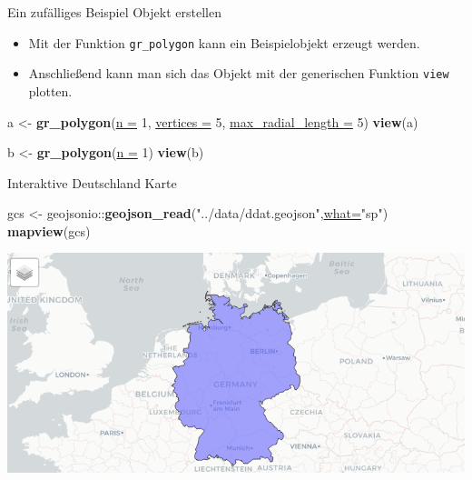 \documentclass[ignorenonframetext,]{beamer}
\newenvironment{Shaded}{\begin{snugshade}}{\end{snugshade}}
\newcommand{\DataTypeTok}[1]{\textcolor[rgb]{0.74,0.68,0.62}{\underline{#1}}}
\newcommand{\DecValTok}[1]{\textcolor[rgb]{0.27,0.67,0.26}{#1}}
\newcommand{\KeywordTok}[1]{\textcolor[rgb]{0.26,0.66,0.93}{\textbf{#1}}}
\newcommand{\NormalTok}[1]{\textcolor[rgb]{0.74,0.68,0.62}{#1}}
\newcommand{\OperatorTok}[1]{\textcolor[rgb]{0.74,0.68,0.62}{#1}}
\newcommand{\StringTok}[1]{\textcolor[rgb]{0.02,0.61,0.04}{#1}}
\providecommand{\tightlist}{%
  \setlength{\itemsep}{0pt}\setlength{\parskip}{0pt}}
\begin{document}
\begin{frame}[fragile]{Ein zufälliges Beispiel Objekt erstellen}
\protect\hypertarget{ein-zufalliges-beispiel-objekt-erstellen}{}

\begin{itemize}
\tightlist
\item
  Mit der Funktion \texttt{gr\_polygon} kann ein Beispielobjekt erzeugt
  werden.
\item
  Anschließend kann man sich das Objekt mit der generischen Funktion
  \texttt{view} plotten.
\end{itemize}

\begin{Shaded}
\begin{Highlighting}[]
\NormalTok{a <-}\StringTok{ }\KeywordTok{gr_polygon}\NormalTok{(}\DataTypeTok{n =} \DecValTok{1}\NormalTok{, }\DataTypeTok{vertices =} \DecValTok{5}\NormalTok{, }\DataTypeTok{max_radial_length =} \DecValTok{5}\NormalTok{)}
\KeywordTok{view}\NormalTok{(a)}
\end{Highlighting}
\end{Shaded}

\begin{Shaded}
\begin{Highlighting}[]
\NormalTok{b <-}\StringTok{ }\KeywordTok{gr_polygon}\NormalTok{(}\DataTypeTok{n =} \DecValTok{1}\NormalTok{)}
\KeywordTok{view}\NormalTok{(b)}
\end{Highlighting}
\end{Shaded}

\end{frame}

\begin{frame}[fragile]{Interaktive Deutschland Karte}
\protect\hypertarget{interaktive-deutschland-karte}{}

\begin{Shaded}
\begin{Highlighting}[]
\NormalTok{gcs <-}\StringTok{ }\NormalTok{geojsonio}\OperatorTok{::}\KeywordTok{geojson_read}\NormalTok{(}\StringTok{"../data/ddat.geojson"}\NormalTok{,}\DataTypeTok{what=}\StringTok{"sp"}\NormalTok{)}
\KeywordTok{mapview}\NormalTok{(gcs)}
\end{Highlighting}
\end{Shaded}

\includegraphics{figure/ddat_geojson.PNG}

\end{frame}
\end{document}
